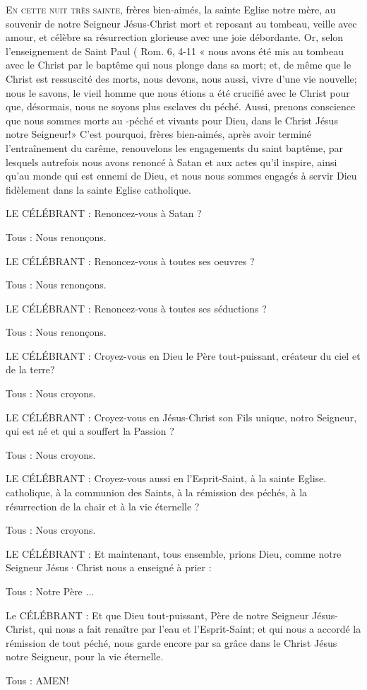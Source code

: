 \documentclass[%
fontsize=14%
,a4paper%
,DIV=15%
]{scrartcl}
\title{\centrer{\huge{Veillée pascale}}}
\author{\texttt{[image: PâquesN-B.jpg]}}
\date{la nuit de la Résurrection\\ avec baptêmes d'adultes}
\begin{document}
\newfontfamily{}
    \def\gretextformat#1{{\fontsize{\taillepolice}{\taillepolice}\selectfont #1}}
    \def\greinitialformat#1{{\lettrines #1}}
    

\lettrine{E}{n cette nuit très sainte}, frères bien-aimés, la sainte Eglise notre
mère, au souvenir de notre Seigneur Jésus-Christ mort et reposant
au tombeau, veille avec amour, et célèbre sa résurrection glorieuse
avec une joie débordante.
Or, selon l'enseignement de Saint Paul ( Rom. 6, 4-11 « nous avons
été mis au tombeau avec le Christ par le baptême qui nous plonge dans
sa mort; et, de même que le Christ est ressuscité des morts, nous devons,
nous aussi, vivre d'une vie nouvelle; nous le savons, le vieil homme
que nous étions a été crucifié avec le Christ pour que, désormais, nous
ne soyons plus esclaves du péché. Aussi, prenons conscience que nous
sommes morts au -péché et vivants pour Dieu, dans le Christ Jésus notre
Seigneur!»
C'est pourquoi, frères bien-aimés, après avoir terminé l'entraînement
du carême, renouvelons les engagements du saint baptême, par lesquels
autrefois nous avons renoncé à Satan et aux actes qu'il inspire, ainsi
qu'au monde qui est ennemi de Dieu, et nous nous sommes engagés
à servir Dieu fidèlement dans la sainte Eglise catholique.

LE CÉLÉBRANT : Renoncez-vous à Satan ?

Tous : Nous renonçons.

LE CÉLÉBRANT : Renoncez-vous à toutes ses oeuvres ?

Tous : Nous renonçons.

LE CÉLÉBRANT : Renoncez-vous à toutes ses séductions ?

Tous : Nous renonçons.

LE CÉLÉBRANT : Croyez-vous en Dieu le Père tout-puissant, créateur
du ciel et de la terre?

Tous : Nous croyons.

LE CÉLÉBRANT : Croyez-vous en Jésus-Christ son Fils unique, notro
Seigneur, qui est né et qui a souffert la Passion ?

Tous : Nous croyons.

LE CÉLÉBRANT : Croyez-vous aussi en l'Esprit-Saint, à la sainte Eglise.
catholique, à la communion des Saints, à la rémission
des péchés, à la résurrection de la chair et à la vie
éternelle ?

Tous : Nous croyons.

LE CÉLÉBRANT : Et maintenant, tous ensemble, prions Dieu, comme
notre Seigneur Jésus·Christ nous a enseigné à prier : 

Tous : Notre Père ...

Le CÉLÉBRANT : Et que Dieu tout-puissant, Père de notre Seigneur
Jésus-Christ, qui nous a fait renaître par l'eau et
l'Esprit-Saint; et qui nous a accordé la rémission
de tout péché, nous garde encore par sa grâce dans le
Christ Jésus notre Seigneur, pour la vie éternelle.

Tous : AMEN!

\end{document}
